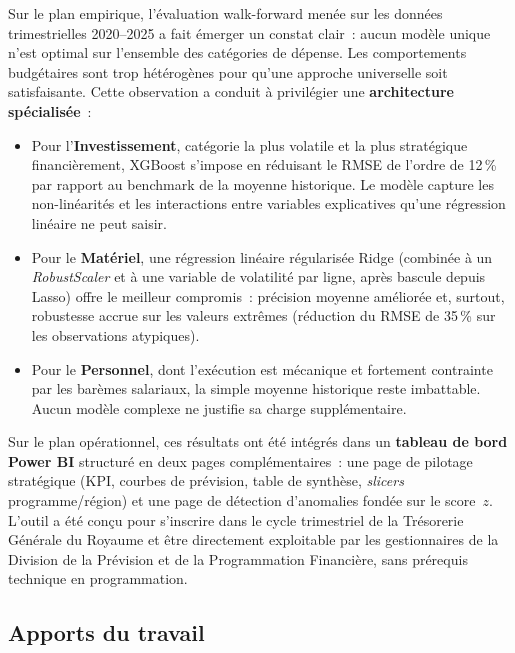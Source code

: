 \documentclass[12pt,a4paper]{article}
\begin{document}
Sur le plan empirique, l'\'evaluation walk-forward men\'ee sur les donn\'ees
trimestrielles 2020--2025 a fait \'emerger un constat clair~: aucun mod\`ele unique
n'est optimal sur l'ensemble des cat\'egories de d\'epense. Les comportements
budg\'etaires sont trop h\'et\'erog\`enes pour qu'une approche universelle soit
satisfaisante. Cette observation a conduit \`a privil\'egier une \textbf{architecture
sp\'ecialis\'ee}~:

\begin{itemize}
    \item Pour l'\textbf{Investissement}, cat\'egorie la plus volatile et la plus
    strat\'egique financi\`erement, XGBoost s'impose en r\'eduisant le RMSE de
    l'ordre de 12\,\% par rapport au benchmark de la moyenne historique. Le mod\`ele
    capture les non-lin\'earit\'es et les interactions entre variables explicatives
    qu'une r\'egression lin\'eaire ne peut saisir.
    \item Pour le \textbf{Mat\'eriel}, une r\'egression lin\'eaire r\'egularis\'ee
    Ridge (combin\'ee \`a un \textit{RobustScaler} et \`a une variable de volatilit\'e
    par ligne, apr\`es bascule depuis Lasso) offre le meilleur compromis~: pr\'ecision
    moyenne am\'elior\'ee et, surtout, robustesse accrue sur les valeurs extr\^emes
    (r\'eduction du RMSE de 35\,\% sur les observations atypiques).
    \item Pour le \textbf{Personnel}, dont l'ex\'ecution est m\'ecanique et fortement
    contrainte par les bar\`emes salariaux, la simple moyenne historique reste
    imbattable. Aucun mod\`ele complexe ne justifie sa charge suppl\'ementaire.
\end{itemize}

Sur le plan op\'erationnel, ces r\'esultats ont \'et\'e int\'egr\'es dans un
\textbf{tableau de bord Power BI} structur\'e en deux pages compl\'ementaires~:
une page de pilotage strat\'egique (KPI, courbes de pr\'evision, table de synth\`ese,
\textit{slicers} programme/r\'egion) et une page de d\'etection d'anomalies fond\'ee
sur le score~$z$. L'outil a \'et\'e con\c{c}u pour s'inscrire dans le cycle trimestriel
de la Tr\'esorerie G\'en\'erale du Royaume et \^etre directement exploitable par les
gestionnaires de la Division de la Pr\'evision et de la Programmation Financi\`ere, sans pr\'erequis technique en programmation.

\subsection*{Apports du travail}
\end{document}
